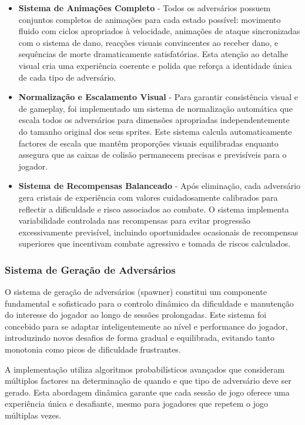 \begin{itemize}
  \item \textbf{Sistema de Animações Completo} - Todos os adversários possuem conjuntos completos de animações para cada estado possível: movimento fluido com ciclos apropriados à velocidade, animações de ataque sincronizadas com o sistema de dano, reacções visuais convincentes ao receber dano, e sequências de morte dramaticamente satisfatórias. Esta atenção ao detalhe visual cria uma experiência coerente e polida que reforça a identidade única de cada tipo de adversário.
  
  \item \textbf{Normalização e Escalamento Visual} - Para garantir consistência visual e de gameplay, foi implementado um sistema de normalização automática que escala todos os adversários para dimensões apropriadas independentemente do tamanho original dos seus sprites. Este sistema calcula automaticamente factores de escala que mantêm proporções visuais equilibradas enquanto assegura que as caixas de colisão permanecem precisas e previsíveis para o jogador.
  
  \item \textbf{Sistema de Recompensas Balanceado} - Após eliminação, cada adversário gera cristais de experiência com valores cuidadosamente calibrados para reflectir a dificuldade e risco associados ao combate. O sistema implementa variabilidade controlada nas recompensas para evitar progressão excessivamente previsível, incluindo oportunidades ocasionais de recompensas superiores que incentivam combate agressivo e tomada de riscos calculados.
\end{itemize}

\subsubsection{Sistema de Geração de Adversários}
\hspace{2em} O sistema de geração de adversários (spawner) constitui um componente fundamental e sofisticado para o controlo dinâmico da dificuldade e manutenção do interesse do jogador ao longo de sessões prolongadas. Este sistema foi concebido para se adaptar inteligentemente ao nível e performance do jogador, introduzindo novos desafios de forma gradual e equilibrada, evitando tanto monotonia como picos de dificuldade frustrantes.

\hspace{2em} A implementação utiliza algoritmos probabilísticos avançados que consideram múltiplos factores na determinação de quando e que tipo de adversário deve ser gerado. Esta abordagem dinâmica garante que cada sessão de jogo oferece uma experiência única e desafiante, mesmo para jogadores que repetem o jogo múltiplas vezes.

